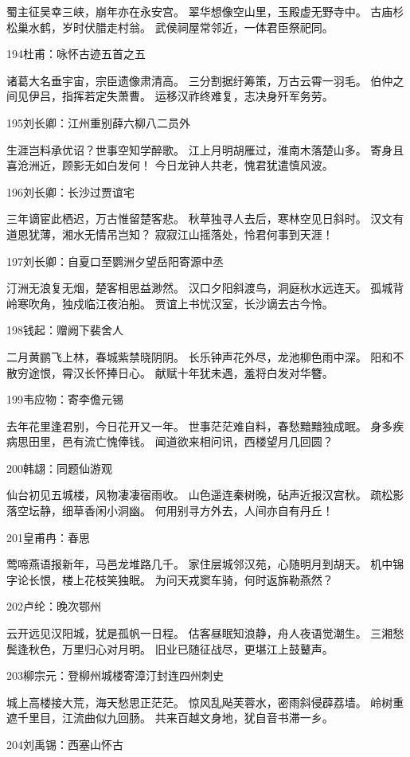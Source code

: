 蜀主征吴幸三峡，崩年亦在永安宫。
翠华想像空山里，玉殿虚无野寺中。
古庙杉松巢水鹤，岁时伏腊走村翁。
武侯祠屋常邻近，一体君臣祭祀同。

194杜甫：咏怀古迹五首之五

诸葛大名垂宇宙，宗臣遗像肃清高。
三分割据纡筹策，万古云霄一羽毛。
伯仲之间见伊吕，指挥若定失萧曹。
运移汉祚终难复，志决身歼军务劳。

195刘长卿：江州重别薛六柳八二员外

生涯岂料承优诏？世事空知学醉歌。
江上月明胡雁过，淮南木落楚山多。
寄身且喜沧洲近，顾影无如白发何！
今日龙钟人共老，愧君犹遣慎风波。

196刘长卿：长沙过贾谊宅

三年谪宦此栖迟，万古惟留楚客悲。
秋草独寻人去后，寒林空见日斜时。
汉文有道恩犹薄，湘水无情吊岂知？
寂寂江山摇落处，怜君何事到天涯！

197刘长卿：自夏口至鹦洲夕望岳阳寄源中丞

汀洲无浪复无烟，楚客相思益渺然。
汉口夕阳斜渡鸟，洞庭秋水远连天。
孤城背岭寒吹角，独戍临江夜泊船。
贾谊上书忧汉室，长沙谪去古今怜。

198钱起：赠阙下裴舍人

二月黄鹂飞上林，春城紫禁晓阴阴。
长乐钟声花外尽，龙池柳色雨中深。
阳和不散穷途恨，霄汉长怀捧日心。
献赋十年犹未遇，羞将白发对华簪。

199韦应物：寄李儋元锡

去年花里逢君别，今日花开又一年。
世事茫茫难自料，春愁黯黯独成眠。
身多疾病思田里，邑有流亡愧俸钱。
闻道欲来相问讯，西楼望月几回圆？

200韩翃：同题仙游观

仙台初见五城楼，风物凄凄宿雨收。
山色遥连秦树晚，砧声近报汉宫秋。
疏松影落空坛静，细草香闲小洞幽。
何用别寻方外去，人间亦自有丹丘！

201皇甫冉：春思

莺啼燕语报新年，马邑龙堆路几千。
家住层城邻汉苑，心随明月到胡天。
机中锦字论长恨，楼上花枝笑独眠。
为问天戎窦车骑，何时返旆勒燕然？

202卢纶：晚次鄂州

云开远见汉阳城，犹是孤帆一日程。
估客昼眠知浪静，舟人夜语觉潮生。
三湘愁鬓逢秋色，万里归心对月明。
旧业已随征战尽，更堪江上鼓鼙声。

203柳宗元：登柳州城楼寄漳汀封连四州刺史

城上高楼接大荒，海天愁思正茫茫。
惊风乱飐芙蓉水，密雨斜侵薜荔墙。
岭树重遮千里目，江流曲似九回肠。
共来百越文身地，犹自音书滞一乡。

204刘禹锡：西塞山怀古

